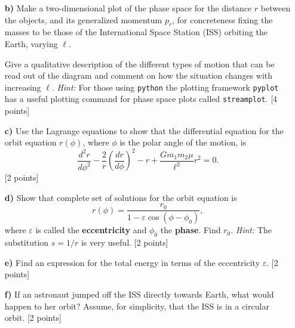 \documentclass[11pt,a4paper]{report}
\newcounter{excount}[chapter]
\newenvironment{exercise}[1][]{\addtocounter{excount}{1} \noindent {\bf Question
    \arabic{excount} \ \ #1}\hspace{2mm}}{\vspace{4mm}}
\begin{document}
\begin{exercise}{\bf Orbital motion\\}
\begin{itemize}
 \item[{\bf b)}] Make a two-dimensional plot of the phase space for the distance $r$ between the objects, and its generalized momentum $p_r$, for concreteness fixing the masses to be those of the International Space Station (ISS) orbiting the Earth, varying $\ell$.

Give a qualitative description of the different types of motion that can be read out of the diagram and comment on how the situation changes with increasing $\ell$. {\it Hint:} For those using {\tt python} the plotting framework {\tt pyplot} has a useful plotting command for phase space plots called {\tt streamplot}.  [4 points]
\item[{\bf c)}] Use the Lagrange equations to show that the differential equation for the orbit equation $r(\phi)$, where $\phi$ is the polar angle of the motion, is
\begin{equation}
\frac{d^2r}{d\phi^2}-\frac{2}{ r}\left(\frac{dr}{d\phi}\right)^2-r+\frac{Gm_1m_2\mu }{\ell^2}r^2=0.
\end{equation}
[2 points]
\item[{\bf d)}] Show that complete set of solutions for the orbit equation  is
\begin{equation}
r(\phi)= \frac{r_0}{1-\varepsilon \cos(\phi-\phi_0)},
\end{equation}
where $\varepsilon$ is called the {\bf eccentricity} and $\phi_0$ the {\bf phase}. Find $r_0$.
{\it Hint:} The substitution $s=1/r$ is very useful. [2 points]
\item[{\bf e)}] Find an expression for the total energy in terms of the eccentricity $\varepsilon$. [2 points]
\item[{\bf f)}] If an astronaut jumped off the ISS directly towards Earth, what would happen to her orbit? Assume, for simplicity, that the ISS is in a circular orbit. [2 points]
\end{itemize}
\end{exercise}
\end{document}
